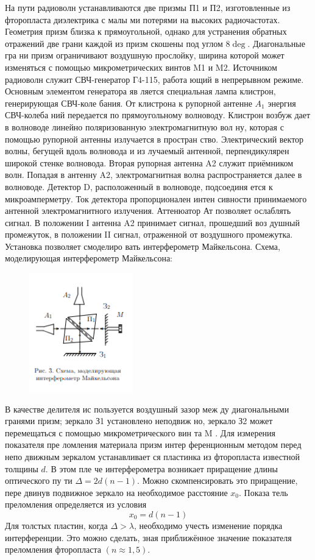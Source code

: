 \documentclass[a4paper, 12pt]{article}
\begin{document}
На пути радиоволн устанавливаются две призмы
П1 и П2, изготовленные из фторопласта  диэлектрика с малы
ми потерями на высоких радиочастотах. Геометрия призм близка
к прямоугольной, однако для устранения обратных отражений две
грани каждой из призм скошены под углом $8\deg$. Диагональные гра
ни призм ограничивают воздушную прослойку, ширина которой
может изменяться с помощью микрометрических винтов M1 и M2.
Источником радиоволн служит СВЧ-генератор Г4-115, работа
ющий в непрерывном режиме. Основным элементом генератора яв
ляется специальная лампа  клистрон, генерирующая СВЧ-коле
бания. От клистрона к рупорной антенне $A_1$ энергия СВЧ-колеба
ний передается по прямоугольному волноводу. Клистрон возбуж
дает в волноводе линейно поляризованную электромагнитную вол
ну, которая с помощью рупорной антенны излучается в простран
ство. Электрический вектор волны, бегущей вдоль волновода и из
лучаемый антенной, перпендикулярен широкой стенке волновода.
Вторая рупорная антенна A2 служит приёмником волн. Попадая
в антенну A2, электромагнитная волна распространяется далее в
волноводе. Детектор D, расположенный в волноводе, подсоединя
ется к микроамперметру. Ток детектора пропорционален интен
сивности принимаемого антенной электромагнитного излучения.
Аттенюатор Ат позволяет ослаблять сигнал.
В положении I антенна A2 принимает сигнал, прошедший воз
душный промежуток, в положении II сигнал, отраженной от
воздушного промежутка.
Установка позволяет смоделиро
вать интерферометр Майкельсона.
\newpage
Схема, моделирующая интерферометр Майкельсона:
\begin{figure}[h!]
    \includegraphics[width=0.4\textwidth]{pictures/scheme2.png}
\end{figure}

В качестве делителя ис
пользуется воздушный зазор меж
ду диагональными гранями призм;
зеркало З1 установлено неподвиж
но, зеркало З2 может перемещаться
с помощью микрометрического вин
та M .
Для измерения показателя пре
ломления материала призм интер
ференционным методом перед непо
движным зеркалом устанавливает
ся пластинка из фторопласта известной толщины $d$. В этом пле
че интерферометра возникает приращение длины оптического пу
ти $\Delta = 2d(n-1)$. Можно скомпенсировать это приращение, пере
двинув подвижное зеркало на необходимое расстояние $x_0$. Показа
тель преломления определяется из условия
\[x_0 = d(n-1)\]
Для толстых пластин, когда $\Delta > \lambda$, необходимо учесть изменение
порядка интерференции. Это можно сделать, зная приближённое
значение показателя преломления фторопласта $(n \approx 1,5)$.
\end{document}
